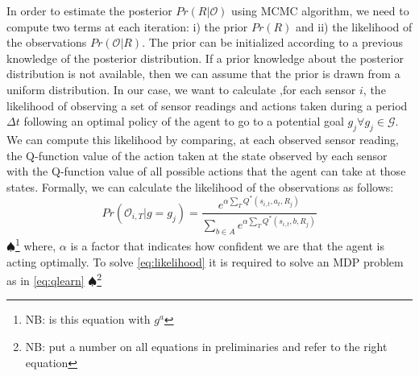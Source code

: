 \documentclass[letterpaper, 10 pt, conference]{ieeeconf}  %
\newcommand\NB[1]{$\spadesuit$\footnote{NB: #1}}
\begin{document}
In order to estimate the posterior $Pr(R|\mathcal{O})$ using MCMC algorithm, we need to compute two terms at each iteration: i) the prior $Pr(R)$ and ii) the likelihood of the observations $Pr(\mathcal{O}|R)$.
The prior can be initialized according to a previous knowledge of the posterior distribution. If a prior knowledge about the posterior distribution is not available, then we can assume that the prior is drawn from a uniform distribution.
In our case, we want to calculate ,for each sensor $i$, the likelihood of observing a set of sensor readings and actions taken during a period $\Delta t$ following an optimal policy of the agent to go to a potential goal $g_j \forall g_j \in \mathcal G$. We can compute this likelihood by comparing, at each observed sensor reading, the Q-function value of the action taken at the state observed by each sensor with the Q-function value of all possible actions that the agent can take at those states. Formally, we can calculate the likelihood of the observations as follows:
\begin{equation}\label{eq:likelihood}
Pr(\mathcal{O}_{i,T} | g = g_j)  = \frac{e^{\alpha\sum_{T}{Q^*(s_{i,t},a_t,R_j)}}}{\sum_{b\in A}{}e^{\alpha\sum_{T}{}Q^*(s_{i,t},b,R_j)}}
\end{equation}
\NB{is this equation with $g^a$}
where, $\alpha$ is a factor that indicates how confident we are that the agent is acting optimally. To solve \eqref{eq:likelihood} it is required to solve an MDP problem as in \eqref{eq:qlearn} \NB{put a number on all equations in preliminaries and refer to the right equation}




%


\end{document}
